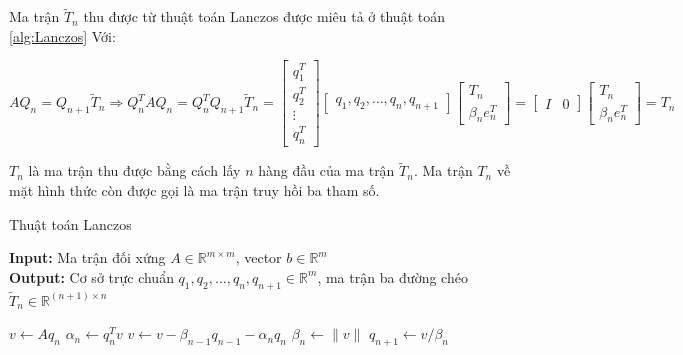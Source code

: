 \documentclass[14pt, a4paper]{article}
\numberwithin{equation}{section}
\numberwithin{algorithm}{section}
\numberwithin{figure}{section}
\numberwithin{dl}{section}
\numberwithin{md}{section}
\numberwithin{bd}{section}
\numberwithin{dn}{section}
\begin{document}
Ma trận $\widetilde{T}_n$ thu được từ thuật toán Lanczos được miêu tả ở thuật toán \ref{alg:Lanczos}
Với:

\begin{equation} \label{eq:Three-term-recurrence}
    AQ_n = Q_{n+1}\widetilde{T}_n \Rightarrow Q_n^TAQ_n = Q_n^TQ_{n+1}\widetilde{T}_n=\begin{bmatrix}
        q_1^T \\ q_2^T \\ \vdots \\ q_n^T
    \end{bmatrix} \begin{bmatrix} q_1, q_2, \dots, q_n, q_{n+1} \end{bmatrix}\begin{bmatrix}
        T_n \\ \beta_n e_n^T
    \end{bmatrix}=\begin{bmatrix}
        I & 0
    \end{bmatrix} \begin{bmatrix}
        T_n \\ \beta_n e_n^T
    \end{bmatrix}=T_n
\end{equation}

$T_n$ là ma trận thu được bằng cách lấy $n$ hàng đầu của ma trận $\widetilde{T}_n$. 
Ma trận $T_n$ về mặt hình thức còn được gọi là ma trận truy hồi ba tham số.

\begin{algorithm}
    \caption{Thuật toán Lanczos}\label{alg:Lanczos}
    \hspace*{\algorithmicindent} \textbf{Input:} {Ma trận đối xứng $A \in \mathbb{R}^{m \times m}$, vector $b \in \mathbb{R}^m$} \\
    \hspace*{\algorithmicindent} \textbf{Output:} {Cơ sở trực chuẩn $q_1, q_2, \dots, q_n, q_{n+1} \in \mathbb{R}^m$, ma trận ba đường chéo $\widetilde{T}_n \in \mathbb{R}^{(n+1) \times n}$}
    \begin{algorithmic}
            \State $v \leftarrow Aq_n$
            \State $\alpha_n \leftarrow q_n^Tv$
            \State $v \leftarrow v - \beta_{n-1}q_{n-1} - \alpha_n q_n$
            \State $\beta_n \leftarrow \lVert v \rVert$
            \State $q_{n+1} \leftarrow v/\beta_n$
        \EndFor
    \end{algorithmic}
\end{algorithm}
\end{document}
